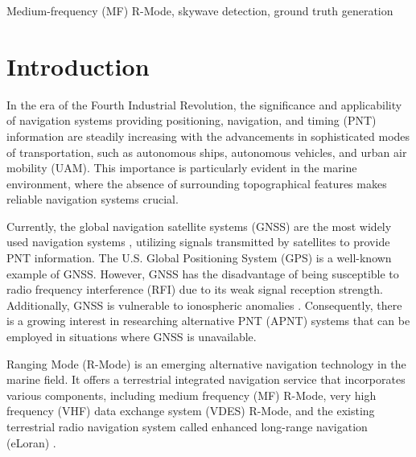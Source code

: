 \documentclass[conference]{IEEEtran}
\begin{document}
\begin{IEEEkeywords}
 Medium-frequency (MF) R-Mode, skywave detection, ground truth generation
\end{IEEEkeywords}

\section{Introduction}
In the era of the Fourth Industrial Revolution, the significance and applicability of navigation systems providing positioning, navigation, and timing (PNT) information are steadily increasing with the advancements in sophisticated modes of transportation, such as autonomous ships, autonomous vehicles, and urban air mobility (UAM).
This importance is particularly evident in the marine environment, where the absence of surrounding topographical features makes reliable navigation systems crucial.

Currently, the global navigation satellite systems (GNSS) are the most widely used navigation systems \cite{Enge11:Global, DeLorenzo10:WAAS/L5, Chen11:Real, Park20:Effects, Kim18:Low, Lee22:Urban}, utilizing signals transmitted by satellites to provide PNT information. 
The U.S. Global Positioning System (GPS) is a well-known example of GNSS. 
However, GNSS has the disadvantage of being susceptible to radio frequency interference (RFI) \cite{Park21:Single, Park18:Dual, Kim19:Mitigation} due to its weak signal reception strength. 
Additionally, GNSS is vulnerable to ionospheric anomalies \cite{Lee17:Monitoring, Kim14:Comprehensive, Lee22:Optimal, Sun21:Markov, Ahmed17:Statistical}. 
Consequently, there is a growing interest in researching alternative PNT (APNT) systems \cite{Li20, Jia21:Ground, Jeong20:RSS, Han19:Smartphone, Lee20:Integrity, Rhee19:Low, Rhee18:Ground, Kim17:SFOL, Lee22:SFOL, Shin17:Autonomous, Kim17:Simulation, Lee22:Evaluation, Kang21:Indoor, Kim23:Low, Lee23:Performance_Comparison} that can be employed in situations where GNSS is unavailable.

Ranging Mode (R-Mode) \cite{Johnson2014:feasibility, Johnson2014:feasibility1, Johnson2014:feasibility3, Johnson2017:initial, Johnson2020:R-Mode, Son23:Skywave, Swaszek2012:ranging, Jeong21:Development} is an emerging alternative navigation technology in the marine field. 
It offers a terrestrial integrated navigation service that incorporates various components, including medium frequency (MF) R-Mode, very high frequency (VHF) data exchange system (VDES) R-Mode, and the existing terrestrial radio navigation system called enhanced long-range navigation (eLoran) \cite{Son19:Universal, Son18:Novel, Kim22:First, Rhee21:Enhanced, Williams13, Son23:Demonstration, Hwang18:TDOA, Son18:Preliminary, Son19:Preliminary, Son20:eLoran}.
\end{document}
